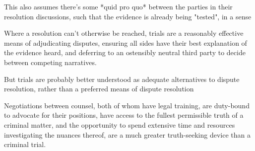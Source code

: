 This also assumes there's some *quid pro quo* between the parties in their resolution discussions, such that the evidence is already being "tested", in a sense

Where a resolution can't otherwise be reached, trials are a reasonably effective means of adjudicating disputes, ensuring all sides have their best explanation of the evidence heard, and deferring to an ostensibly neutral third party to decide between competing narratives.

But trials are probably better understood as adequate alternatives to dispute resolution, rather than a preferred means of dispute resolution

Negotiations between counsel, both of whom have legal training, are duty-bound to advocate for their positions, have access to the fullest permissible truth of a criminal matter, and the opportunity to spend extensive time and resources investigating the nuances thereof, are a much greater truth-seeking device than a criminal trial.

